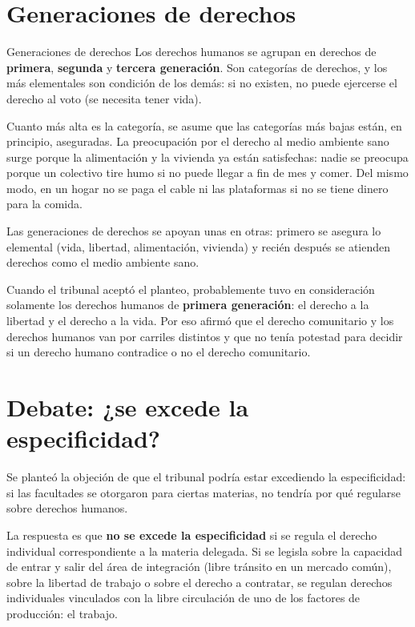 \documentclass[12pt,oneside]{book}
\begin{document}
\section{Generaciones de derechos}

\begin{definition}{Generaciones de derechos}
Los derechos humanos se agrupan en derechos de \textbf{primera}, \textbf{segunda} y \textbf{tercera generación}. Son categorías de derechos, y los más elementales son condición de los demás: si no existen, no puede ejercerse el derecho al voto (se necesita tener vida).
\end{definition}

Cuanto más alta es la categoría, se asume que las categorías más bajas están, en principio, aseguradas. La preocupación por el derecho al medio ambiente sano surge porque la alimentación y la vivienda ya están satisfechas: nadie se preocupa porque un colectivo tire humo si no puede llegar a fin de mes y comer. Del mismo modo, en un hogar no se paga el cable ni las plataformas si no se tiene dinero para la comida.

\begin{important}
Las generaciones de derechos se apoyan unas en otras: primero se asegura lo elemental (vida, libertad, alimentación, vivienda) y recién después se atienden derechos como el medio ambiente sano.
\end{important}

Cuando el tribunal aceptó el planteo, probablemente tuvo en consideración solamente los derechos humanos de \textbf{primera generación}: el derecho a la libertad y el derecho a la vida. Por eso afirmó que el derecho comunitario y los derechos humanos van por carriles distintos y que no tenía potestad para decidir si un derecho humano contradice o no el derecho comunitario.

\section{Debate: ¿se excede la especificidad?}

Se planteó la objeción de que el tribunal podría estar excediendo la especificidad: si las facultades se otorgaron para ciertas materias, no tendría por qué regularse sobre derechos humanos.

La respuesta es que \textbf{no se excede la especificidad} si se regula el derecho individual correspondiente a la materia delegada. Si se legisla sobre la capacidad de entrar y salir del área de integración (libre tránsito en un mercado común), sobre la libertad de trabajo o sobre el derecho a contratar, se regulan derechos individuales vinculados con la libre circulación de uno de los factores de producción: el trabajo.
\end{document}
